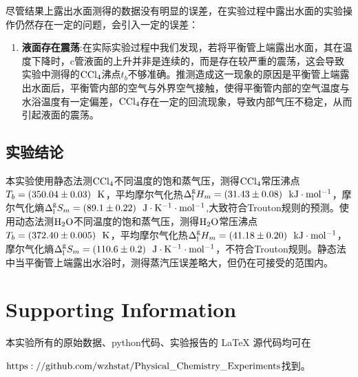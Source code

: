 \documentclass[12pt]{article}
\begin{document}
		\par
		尽管结果上露出水面测得的数据没有明显的误差，在实验过程中露出水面的实验操作仍然存在一定的问题，会引入一定的误差：
		\begin{enumerate}
			\item \textbf{液面存在震荡}:在实际实验过程中我们发现，若将平衡管上端露出水面，其在温度下降时，c管液面的上升并非是连续的，而是存在较严重的震荡，这会导致实验中测得的$\rm CCl_{4}$沸点$t_{b}$不够准确。推测造成这一现象的原因是平衡管上端露出水面后，平衡管内部的空气与外界空气接触，使得平衡管内部的空气温度与水浴温度有一定偏差，${\rm CCl_{4}}$存在一定的回流现象，导致内部气压不稳定，从而引起液面的震荡。
		\end{enumerate}
 		\subsection{实验结论}
		 本实验使用静态法测$\rm CCl_{4}$不同温度的饱和蒸气压，测得$\rm CCl_{4}$常压沸点$T_{b}=(350.04\pm 0.03)\ \ {\rm K}$，平均摩尔气化热$\Delta^{\rm g}_{\rm l}H_{m}=(31.43\pm 0.08)\ \ {\rm kJ\cdot mol^{-1}}$，摩尔气化熵$\Delta^{\rm g}_{\rm l}S_{m}=(89.1\pm 0.22)\ \ {\rm J\cdot K^{-1}\cdot mol^{-1}}$,大致符合Trouton规则的预测。使用动态法测$\rm H_{2}O$不同温度的饱和蒸气压，测得$\rm H_{2}O$常压沸点$T_{b}=(372.40\pm 0.005)\ \ {\rm K}$，平均摩尔气化热$\Delta^{\rm g}_{\rm l}H_{m}=(41.18\pm 0.20)\ \ {\rm kJ\cdot mol^{-1}}$，摩尔气化熵$\Delta^{\rm g}_{\rm l}S_{m}=(110.6\pm 0.2)\ \ {\rm J\cdot K^{-1}\cdot mol^{-1}}$，不符合Trouton规则。静态法中当平衡管上端露出水浴时，测得蒸汽压误差略大，但仍在可接受的范围内。
	\section{Supporting Information}
		 本实验所有的原始数据、python代码、实验报告的 LaTeX 源代码均可在\par
		  $\rm{https://github.com/wzhstat/Physical\_Chemistry\_Experiments}$找到。

\vbox{}  


\end{document}
